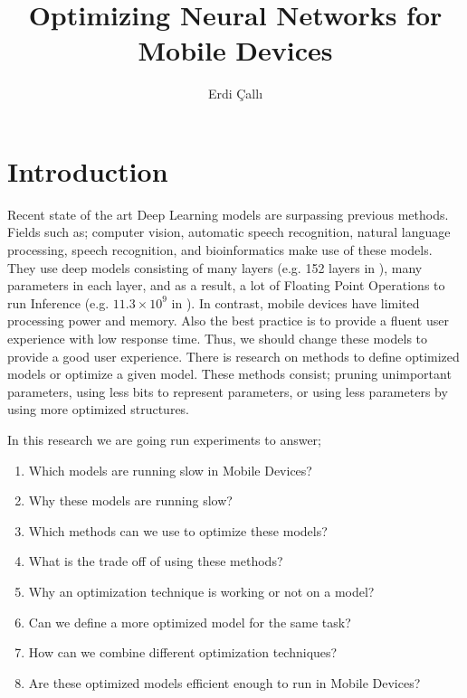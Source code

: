 \documentclass[a4paper,man,natbib]{apa6}
\title{Optimizing Neural Networks for Mobile Devices}
\author{Erdi \c{C}all{\i}}
\affiliation{Radboud University Nijmegen, Neurant}
\begin{document}
\maketitle
\section{Introduction}
Recent state of the art Deep Learning models are surpassing previous methods. Fields such as; computer vision, automatic speech recognition, natural language processing, speech recognition, and bioinformatics make use of these models. They use deep models consisting of many layers (e.g. 152 layers in  \cite{He:2015aa}), many parameters in each layer, and as a result, a lot of Floating Point Operations to run Inference (e.g. $11.3 \times 10^9$ in  \cite{He:2015aa}).
In contrast, mobile devices have limited processing power and memory. Also the best practice is to provide a fluent user experience with low response time. Thus, we should change these models to provide a good user experience.
There is research on methods to define optimized models or optimize a given model. These methods consist; pruning unimportant parameters, using less bits to represent parameters, or using less parameters by using more optimized structures. 

In this research we are going run experiments to answer;
\begin{enumerate}
\item    Which models are running slow in Mobile Devices?
\item    Why these models are running slow?
\item    Which methods can we use to optimize these models?
\item    What is the trade off of using these methods?
\item    Why an optimization technique is working or not on a model?
\item    Can we define a more optimized model for the same task?
\item    How can we combine different optimization techniques?
\item    Are these optimized models efficient enough to run in Mobile Devices? 
\end{enumerate}


\end{document}
